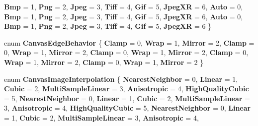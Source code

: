 \begin{DoxyCompactItemize}
{\bfseries Bmp} = 1, 
\newline
{\bfseries Png} = 2, 
{\bfseries Jpeg} = 3, 
{\bfseries Tiff} = 4, 
{\bfseries Gif} = 5, 
\newline
{\bfseries Jpeg\+XR} = 6, 
{\bfseries Auto} = 0, 
{\bfseries Bmp} = 1, 
{\bfseries Png} = 2, 
\newline
{\bfseries Jpeg} = 3, 
{\bfseries Tiff} = 4, 
{\bfseries Gif} = 5, 
{\bfseries Jpeg\+XR} = 6, 
\newline
{\bfseries Auto} = 0, 
{\bfseries Bmp} = 1, 
{\bfseries Png} = 2, 
{\bfseries Jpeg} = 3, 
\newline
{\bfseries Tiff} = 4, 
{\bfseries Gif} = 5, 
{\bfseries Jpeg\+XR} = 6
 \}
\item 
\mbox{\label{namespace_microsoft_1_1_graphics_1_1_canvas_a0820dd282edd1b22994fc94021da353e}} 
enum {\bfseries Canvas\+Edge\+Behavior} \{ \newline
{\bfseries Clamp} = 0, 
{\bfseries Wrap} = 1, 
{\bfseries Mirror} = 2, 
{\bfseries Clamp} = 0, 
\newline
{\bfseries Wrap} = 1, 
{\bfseries Mirror} = 2, 
{\bfseries Clamp} = 0, 
{\bfseries Wrap} = 1, 
\newline
{\bfseries Mirror} = 2, 
{\bfseries Clamp} = 0, 
{\bfseries Wrap} = 1, 
{\bfseries Mirror} = 2, 
\newline
{\bfseries Clamp} = 0, 
{\bfseries Wrap} = 1, 
{\bfseries Mirror} = 2
 \}
\item 
\mbox{\label{namespace_microsoft_1_1_graphics_1_1_canvas_abc4f24be9a610e40780a91ad57c2e1c3}} 
enum {\bfseries Canvas\+Image\+Interpolation} \{ \newline
{\bfseries Nearest\+Neighbor} = 0, 
{\bfseries Linear} = 1, 
{\bfseries Cubic} = 2, 
{\bfseries Multi\+Sample\+Linear} = 3, 
\newline
{\bfseries Anisotropic} = 4, 
{\bfseries High\+Quality\+Cubic} = 5, 
{\bfseries Nearest\+Neighbor} = 0, 
{\bfseries Linear} = 1, 
\newline
{\bfseries Cubic} = 2, 
{\bfseries Multi\+Sample\+Linear} = 3, 
{\bfseries Anisotropic} = 4, 
{\bfseries High\+Quality\+Cubic} = 5, 
\newline
{\bfseries Nearest\+Neighbor} = 0, 
{\bfseries Linear} = 1, 
{\bfseries Cubic} = 2, 
{\bfseries Multi\+Sample\+Linear} = 3, 
\newline
{\bfseries Anisotropic} = 4, 

\end{DoxyCompactItemize}
